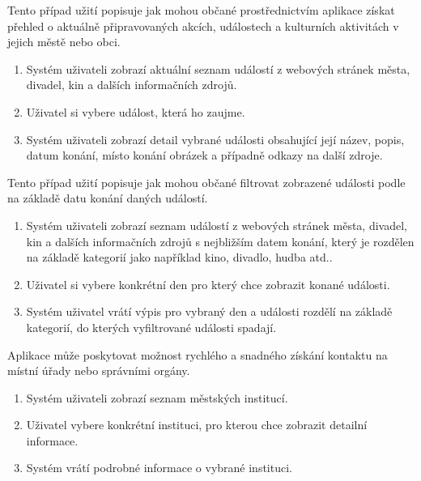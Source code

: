Tento případ užití popisuje jak mohou občané prostřednictvím aplikace získat přehled o aktuálně připravovaných akcích, událostech a kulturních 
aktivitách v jejich městě nebo obci. 

\begin{enumerate}
  \item Systém uživateli zobrazí aktuální seznam událostí z webových stránek města, divadel, kin a dalších informačních zdrojů.
  \item Uživatel si vybere událost, která ho zaujme.
  \item Systém uživateli zobrazí detail vybrané události obsahující její název, popis, datum konání, místo konání obrázek a případně odkazy na další zdroje.
\end{enumerate}

Tento případ užití popisuje jak mohou občané filtrovat zobrazené události podle na základě datu konání daných událostí.

\begin{enumerate}
  \item Systém uživateli zobrazí seznam událostí z webových stránek města, divadel, kin a dalších informačních zdrojů s nejbližším datem konání, který 
  je rozdělen na základě kategorií jako například kino, divadlo, hudba atd..
  \item Uživatel si vybere konkrétní den pro který chce zobrazit konané události.
  \item Systém uživatel vrátí výpis pro vybraný den a události rozdělí na základě kategorií, do kterých vyfiltrované události spadají.
\end{enumerate}

Aplikace může poskytovat možnost rychlého a snadného získání kontaktu na místní úřady nebo správními orgány. %

\begin{enumerate}
  \item Systém uživateli zobrazí seznam městských institucí.
  \item Uživatel vybere konkrétní instituci, pro kterou chce zobrazit detailní informace.
  \item Systém vrátí podrobné informace o vybrané instituci.  
\end{enumerate}

